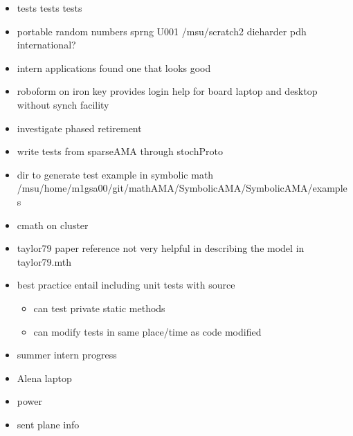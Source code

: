 \documentclass[hyperref]{labbook}
\begin{document}

\begin{itemize}
\item tests tests tests
\item portable random numbers sprng U001 /msu/scratch2  dieharder pdh international?
\end{itemize}

\begin{itemize}
\item intern applications found one that looks good
\item roboform on iron key provides login help for board laptop and desktop without synch facility
\item investigate phased retirement
\end{itemize}


\begin{itemize}
\item write tests  from sparseAMA through stochProto
\item dir to generate test example in symbolic math
/msu/home/m1gsa00/git/mathAMA/SymbolicAMA/SymbolicAMA/examples
\item cmath on cluster
\item taylor79  paper reference not very helpful in describing the model in taylor79.mth
\item best practice entail including unit tests with source
  \begin{itemize}
  \item can test private static methods
  \item can modify tests in same place/time  as code modified
  \end{itemize}

\end{itemize}

\begin{itemize}
\item summer intern progress
\end{itemize}

\begin{itemize}
\item Alena laptop
\item power
\item sent plane info
\end{itemize}
\end{document}
